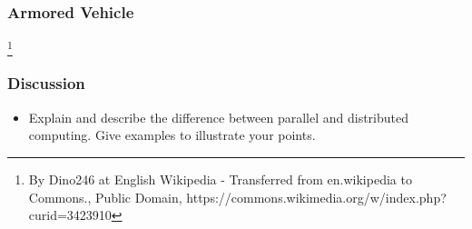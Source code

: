\documentclass{beamer}
\begin{document}
\begin{CJK}{UTF8}{bsmi}
  \begin{frame}
    \frametitle{Armored Vehicle}
    \centerline{}
    \footnote{By Dino246 at English Wikipedia - Transferred from en.wikipedia to Commons., Public Domain, https://commons.wikimedia.org/w/index.php?curid=3423910}
  \end{frame}

  \begin{frame}
    \frametitle{Discussion} 
    \begin{itemize}
    \item Explain and describe the difference between parallel and
      distributed computing.  Give examples to illustrate your points.
    \end{itemize}
  \end{frame}


\end{CJK}
\end{document}

